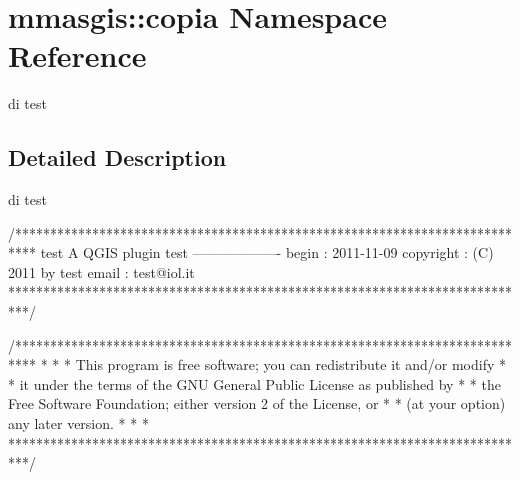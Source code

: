 \hypertarget{namespacemmasgis_1_1copia}{
\section{mmasgis::copia Namespace Reference}
\label{namespacemmasgis_1_1copia}
}


di test  




\subsection{Detailed Description}
di test \begin{DoxyVerb}
/***************************************************************************
 test
                 A QGIS plugin
 test
              -------------------
        begin                : 2011-11-09
        copyright            : (C) 2011 by test
        email                : test@iol.it
 ***************************************************************************/

/***************************************************************************
 *                                                                         *
 *   This program is free software; you can redistribute it and/or modify  *
 *   it under the terms of the GNU General Public License as published by  *
 *   the Free Software Foundation; either version 2 of the License, or     *
 *   (at your option) any later version.                                   *
 *                                                                         *
 ***************************************************************************/
\end{DoxyVerb}
 
